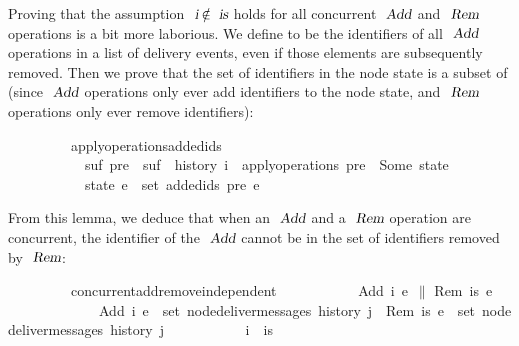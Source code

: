 Proving that the assumption $\isa{i} \mathbin{\isasymnotin} \isa{is}$ holds for all concurrent $\isa{Add}$ and $\isa{Rem}$ operations is a bit more laborious.
We define  to be the identifiers of all $\isa{Add}$ operations in a list of delivery events, even if those elements are subsequently removed.
Then we prove that the set of identifiers in the node state is a subset of  (since $\isa{Add}$ operations only ever add identifiers to the node state, and $\isa{Rem}$ operations only ever remove identifiers):
\vspace{0.25em}
\begin{isabellebody}
\ \ \ \ \ \ \ \ \ apply{\isacharunderscore}operations{\isacharunderscore}added{\isacharunderscore}ids{\isacharcolon}\isanewline
\ \ \ \ \ \ \ \ \ \ \ {\isachardoublequoteopen}{\isasymexists}suf{\isachardot}\ pre\ {\isacharat}\ suf\ {\isacharequal}\ history\ i{\isachardoublequoteclose}\ \ {\isachardoublequoteopen}apply{\isacharunderscore}operations\ pre\ {\isacharequal}\ Some\ state{\isachardoublequoteclose}\isanewline
\ \ \ \ \ \ \ \ \ \ \ {\isachardoublequoteopen}state\ e\ {\isasymsubseteq}\ set\ {\isacharparenleft}added{\isacharunderscore}ids\ pre\ e{\isacharparenright}{\isachardoublequoteclose}
\end{isabellebody}
\vspace{0.25em}
\noindent From this lemma, we deduce that when an $\isa{Add}$ and a $\isa{Rem}$ operation are concurrent, the identifier of the $\isa{Add}$ cannot be in the set of identifiers removed by $\isa{Rem}$:
\vspace{0.25em}
\begin{isabellebody}
\ \ \ \ \ \ \ \ \ concurrent{\isacharunderscore}add{\isacharunderscore}remove{\isacharunderscore}independent{\isacharcolon}\isanewline
\ \ \ \ \ \ \ \ \ \ \ {\isachardoublequoteopen}{\isacharparenleft}Add\ i\ e{}{\isacharparenright}\ $\|$ {\isacharparenleft}Rem\ is\ e{}{\isacharparenright}{\isachardoublequoteclose}\ \isanewline
\ \ \ \ \ \ \ \ \ \ \ \ \ {\isachardoublequoteopen}Add\ i\ e{}\ {\isasymin}\ set\ {\isacharparenleft}node{\isacharunderscore}deliver{\isacharunderscore}messages\ {\isacharparenleft}history\ j{\isacharparenright}{\isacharparenright}{\isachardoublequoteclose}\ \ {\isachardoublequoteopen}Rem\ is\ e{}\ {\isasymin}\ set\ {\isacharparenleft}node{\isacharunderscore}deliver{\isacharunderscore}messages\ {\isacharparenleft}history\ j{\isacharparenright}{\isacharparenright}{\isachardoublequoteclose}\isanewline
\ \ \ \ \ \ \ \ \ \ \ {\isachardoublequoteopen}i\ {\isasymnotin}\ is{\isachardoublequoteclose}
\end{isabellebody}
